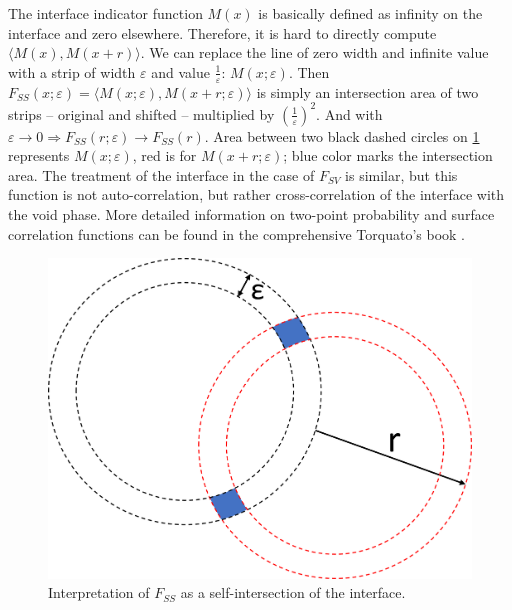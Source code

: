 \documentclass[reprint,amsmath,amssymb,aps,pre,showkeys,showpacs]{revtex4-1}
\begin{document}
The interface indicator function $M(x)$ is basically defined as infinity on the
interface and zero elsewhere. Therefore, it is hard to directly compute
$\langle M(x), M(x + r) \rangle$. We can replace the line of zero width and infinite value
with a strip of width $\varepsilon$ and value $\frac{1}{\varepsilon}$: $M(x; \varepsilon)$.
Then $F_{SS}(x; \varepsilon) = \langle M(x; \varepsilon), M(x + r; \varepsilon) \rangle$
is simply an intersection area of two strips -- original and shifted --
multiplied by $(\frac{1}{\varepsilon})^2$.
And with $\varepsilon \to 0 \Rightarrow F_{SS}(r; \varepsilon) \to F_{SS}(r)$.
Area between two black dashed circles on \cref{fig:Fss-explained} represents
$M(x; \varepsilon)$, red is for $M(x + r; \varepsilon)$; blue color marks the
intersection area. The treatment of the interface in the case of $F_{SV}$ is similar, but this function is not auto-correlation, but rather cross-correlation of the interface with the void phase. More detailed information on two-point probability and
surface correlation functions can be found in the comprehensive Torquato's book \cite{Torquato_book}.

\begin{figure}
  \centering
  \includegraphics[width=\linewidth]{images/Fss.png}
  \caption[]{Interpretation of $F_{SS}$ as a self-intersection of the interface.}
  \label{fig:Fss-explained}
\end{figure}
\end{document}
